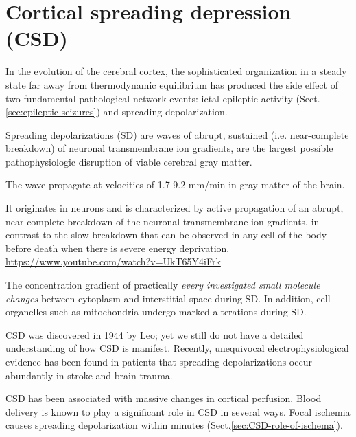 \section{Cortical spreading depression (CSD)}
\label{sec:cortical-spreading-depression}

In the evolution of the cerebral cortex, the sophisticated organization in a
steady state far away from thermodynamic equilibrium has produced the side
effect of two fundamental pathological network events: ictal epileptic activity
(Sect.\ref{sec:epileptic-seizures}) and spreading depolarization.

\begin{mdframed}

Spreading depolarizations (SD) are waves of abrupt, sustained (i.e.
near-complete breakdown) of neuronal transmembrane ion gradients, are the
largest possible pathophysiologic disruption of viable cerebral gray matter.

The wave propagate at velocities of 1.7-9.2 mm/min in
gray matter of the brain.

It originates in neurons and is characterized by active propagation of an
abrupt, near-complete breakdown of the neuronal transmembrane ion gradients, in
contrast to the slow breakdown that can be observed in any cell of the body
before death when there is severe energy deprivation.
\url{https://www.youtube.com/watch?v=UkT65Y4iFrk}

The concentration gradient of practically {\it every investigated small molecule
changes} between cytoplasm and interstitial space during SD.
In addition, cell organelles such as mitochondria undergo marked alterations
during SD.

\end{mdframed}

CSD was discovered in 1944 by Leo; yet we still do not have a detailed
understanding of how CSD is manifest.  Recently, unequivocal
electrophysiological evidence has been found in patients that spreading
depolarizations occur abundantly in stroke and brain trauma.

CSD has been associated with massive changes in cortical perfusion.
Blood delivery is known to play a significant role in CSD in several ways.
Focal ischemia causes spreading depolarization within minutes
(Sect.\ref{sec:CSD-role-of-ischema}).

